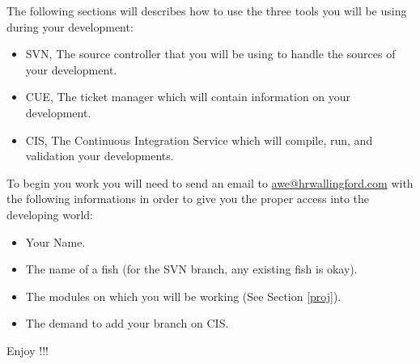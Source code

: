 %
The following sections will describes how to use the three tools you will be
using during your development:
\begin{itemize}
\item SVN, The source controller that you will be using to handle the sources of
your development.
\item CUE, The ticket manager which will contain information on your
development.
\item CIS, The Continuous Integration Service which will compile, run, and
validation your developments.
\end{itemize}
%
\label{mail}
To begin you work you will need to send an email to \url{awe@hrwallingford.com}
with the following informations in order to give you the proper access into the
\telemacsystem developing world:
\begin{itemize}
\item Your Name.
\item The name of a fish (for the SVN branch, any existing fish is okay).
\item The \telemacsystem modules on which you will be working (See Section \ref{proj}).
\item The demand to add your branch on CIS.
\end{itemize}
%
Enjoy !!!
